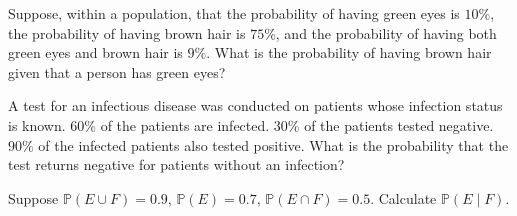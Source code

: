 \documentclass[../main.tex]{subfiles}
\begin{document}
\begin{example} \label{ex:conditional-eyes-hair}
  Suppose, within a population, that the probability of having green eyes is \(10\%\), the probability of having brown hair is \(75\%\), and the probability of having both green eyes and brown hair is \(9\%\). What is the probability of having brown hair given that a person has green eyes?

\end{example}

\begin{example} \label{ex:conditional-infection-test}
  A test for an infectious disease was conducted on patients whose infection status is known.  \(60\%\) of the patients are infected. \(30\%\) of the patients tested negative. \(90\%\) of the infected patients also tested positive.  What is the probability that  the test returns negative for patients without an infection?

\end{example}

\begin{exercise} \label{ex:conditional-practice}
  Suppose \(\mathbb{P}(E \cup F) = 0.9\), \(\mathbb{P}(E) = 0.7\), \(\mathbb{P}(E \cap F) = 0.5\). Calculate \(\mathbb{P}(E \mid F)\).

\end{exercise}
\end{document}
